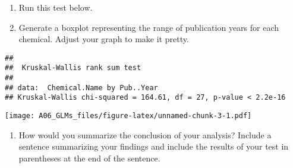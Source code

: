 \documentclass[]{article}
\newenvironment{Shaded}{\begin{snugshade}}{\end{snugshade}}
\newcommand{\KeywordTok}[1]{\textcolor[rgb]{0.13,0.29,0.53}{\textbf{#1}}}
\newcommand{\DataTypeTok}[1]{\textcolor[rgb]{0.13,0.29,0.53}{#1}}
\newcommand{\DecValTok}[1]{\textcolor[rgb]{0.00,0.00,0.81}{#1}}
\newcommand{\FloatTok}[1]{\textcolor[rgb]{0.00,0.00,0.81}{#1}}
\newcommand{\StringTok}[1]{\textcolor[rgb]{0.31,0.60,0.02}{#1}}
\newcommand{\CommentTok}[1]{\textcolor[rgb]{0.56,0.35,0.01}{\textit{#1}}}
\newcommand{\OperatorTok}[1]{\textcolor[rgb]{0.81,0.36,0.00}{\textbf{#1}}}
\newcommand{\NormalTok}[1]{#1}
\providecommand{\tightlist}{%
  \setlength{\itemsep}{0pt}\setlength{\parskip}{0pt}}
\begin{document}
\begin{enumerate}
\def\labelenumi{\arabic{enumi}.}
\setcounter{enumi}{6}
\item
  Run this test below.
\item
  Generate a boxplot representing the range of publication years for
  each chemical. Adjust your graph to make it pretty.
\end{enumerate}

\begin{Shaded}
\end{Shaded}

\begin{verbatim}
## 
##  Kruskal-Wallis rank sum test
## 
## data:  Chemical.Name by Pub..Year
## Kruskal-Wallis chi-squared = 164.61, df = 27, p-value < 2.2e-16
\end{verbatim}

\begin{Shaded}
\end{Shaded}

\texttt{[image: A06\_GLMs\_files/figure-latex/unnamed-chunk-3-1.pdf]}

\begin{enumerate}
\def\labelenumi{\arabic{enumi}.}
\setcounter{enumi}{8}
\tightlist
\item
  How would you summarize the conclusion of your analysis? Include a
  sentence summarizing your findings and include the results of your
  test in parentheses at the end of the sentence.
\end{enumerate}
\end{document}
